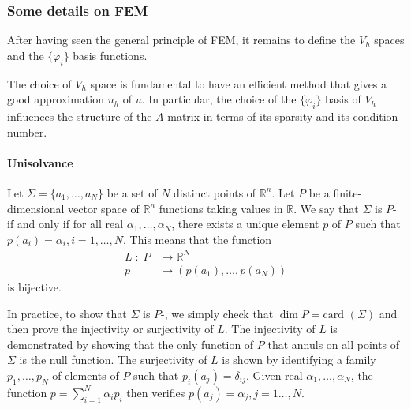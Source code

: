 \subsubsection{Some details on FEM}

After having seen the general principle of FEM, it remains to define the $V_h$ spaces and the $\{\varphi_i\}$ basis functions.

\begin{Rem}
	The choice of $V_h$ space is fundamental to have an efficient method that gives a good approximation $u_h$ of $u$. In particular, the choice of the $\{\varphi_i\}$ basis of $V_h$ influences the structure of the $A$ matrix in terms of its sparsity and its condition number.
\end{Rem}



\paragraph{Unisolvance}

\begin{Def}
	Let $\Sigma=\{a_1,\dots,a_N\}$ be a set of $N$ distinct points of $\mathbb{R}^n$. Let $P$ be a finite-dimensional vector space of $\mathbb{R}^n$ functions taking values in $\mathbb{R}$. We say that $\Sigma$ is $P$- if and only if for all real $\alpha_1,\dots,\alpha_N$, there exists a unique element $p$ of $P$ such that $p(a_i)=\alpha_i,i=1,\dots,N$. 
	This means that the function
	\begin{align*}
		L \; : \; P &\rightarrow \mathbb{R}^N \\
		p &\mapsto(p(a_1),\dots,p(a_N))
	\end{align*}
	is bijective.
\end{Def}

\begin{Rem}
	In practice, to show that $\Sigma$ is $P$-, we simply check that $\dim P= \text{card } (\Sigma)$ and then prove the injectivity or surjectivity of $L$. The injectivity of $L$ is demonstrated by showing that the only function of $P$ that annuls on all points of $\Sigma$ is the null function. The surjectivity of $L$ is shown by identifying a family $p_1,\dots,p_N$ of elements of $P$ such that $p_i(a_j)=\delta_{ij}$. Given real $\alpha_1,\dots,\alpha_N$, the function $p=\sum_{i=1}^N\alpha_i p_i$ then verifies $p(a_j)=\alpha_j,j=1\dots,N$. 
\end{Rem}

